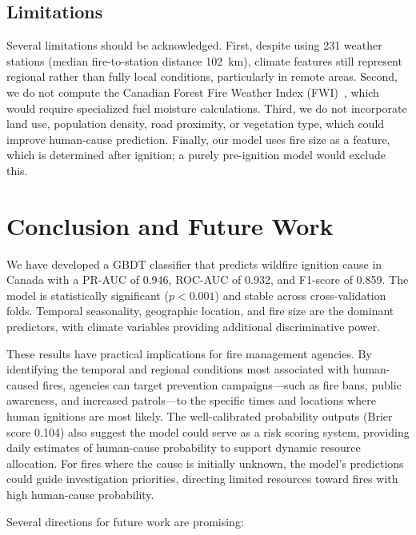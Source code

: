 \documentclass[sigconf,nonacm]{acmart}
\begin{document}
\subsection{Limitations}

Several limitations should be acknowledged. First, despite using 231 weather stations (median fire-to-station distance 102~km), climate features still represent regional rather than fully local conditions, particularly in remote areas. Second, we do not compute the Canadian Forest Fire Weather Index (FWI)~\cite{vanwagner1987}, which would require specialized fuel moisture calculations. Third, we do not incorporate land use, population density, road proximity, or vegetation type, which could improve human-cause prediction. Finally, our model uses fire size as a feature, which is determined after ignition; a purely pre-ignition model would exclude this.

\section{Conclusion and Future Work}

We have developed a GBDT classifier that predicts wildfire ignition cause in Canada with a PR-AUC of 0.946, ROC-AUC of 0.932, and F1-score of 0.859. The model is statistically significant ($p < 0.001$) and stable across cross-validation folds. Temporal seasonality, geographic location, and fire size are the dominant predictors, with climate variables providing additional discriminative power.

These results have practical implications for fire management agencies. By identifying the temporal and regional conditions most associated with human-caused fires, agencies can target prevention campaigns---such as fire bans, public awareness, and increased patrols---to the specific times and locations where human ignitions are most likely. The well-calibrated probability outputs (Brier score 0.104) also suggest the model could serve as a risk scoring system, providing daily estimates of human-cause probability to support dynamic resource allocation. For fires where the cause is initially unknown, the model's predictions could guide investigation priorities, directing limited resources toward fires with high human-cause probability.

Several directions for future work are promising:
\end{document}
